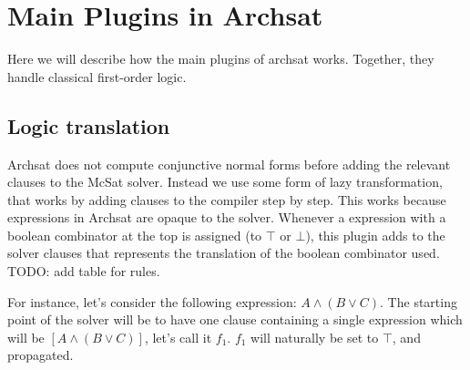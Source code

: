 
\section{Main Plugins in Archsat}

Here we will describe how the main plugins of archsat works. Together,
they handle classical first-order logic.

\subsection{Logic translation}

Archsat does not compute conjunctive normal forms before adding the relevant
clauses to the McSat solver. Instead we use some form of lazy transformation,
that works by adding clauses to the compiler step by step. This works
because expressions in Archsat are opaque to the solver. Whenever a
expression with a boolean combinator at the top is assigned (to $\top$
or $\bot$), this plugin adds to the solver clauses that represents the
translation of the boolean combinator used.
TODO: add table for rules.

For instance, let's consider the following expression: $A \land (B \lor C)$.
The starting point of the solver will be to have one clause containing a single
expression which will be $[A \land (B \lor C)]$, let's call it $f_1$.
$f_1$ will naturally be set to $\top$, and propagated.


